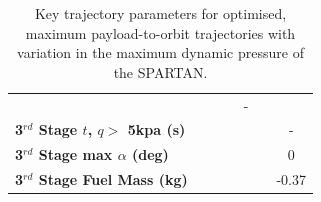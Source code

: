 \begin{table}[ht!]
\begin{tabular}{l c c c c c c}
		& \textbf{\thirddExergyEffqStandardNoReturn}
		& \textbf{\thirddExergyEffqFiftyFiveNoReturn}
		& \textbf{\thirddExergyEffqSixtyNoReturn}
		& -
		\\
		\textbf{3$^{rd}$ Stage $t$, $q >$ 5kpa (s)}
		& \thirdqOverFiveqFortyNoReturn
		& \thirdqOverFiveqFortyFiveNoReturn
		& \thirdqOverFiveqStandardNoReturn
		& \thirdqOverFiveqFiftyFiveNoReturn
		& \thirdqOverFiveqSixtyNoReturn
		& -
		\\
		\textbf{3$^{rd}$ Stage max $\alpha$ (deg)}
		& \thirdmaxAoAqFortyNoReturn
		& \thirdmaxAoAqFortyFiveNoReturn
		& \thirdmaxAoAqStandardNoReturn
		& \thirdmaxAoAqFiftyFiveNoReturn
		& \thirdmaxAoAqSixtyNoReturn
		&0
		\\
		\textbf{3$^{rd}$ Stage Fuel Mass (kg)}
		& \thirdmFuelqFortyNoReturn
		& \thirdmFuelqFortyFiveNoReturn
		& \thirdmFuelqStandardNoReturn
		& \thirdmFuelqFiftyFiveNoReturn
		& \thirdmFuelqSixtyNoReturn
		&-0.37
		\\
		\hline 
	\end{tabular} 
	\caption{Key trajectory parameters for optimised, maximum payload-to-orbit trajectories with variation in the maximum dynamic pressure of the SPARTAN.}
	\label{tab:qvarnoreturn}
\end{table}





